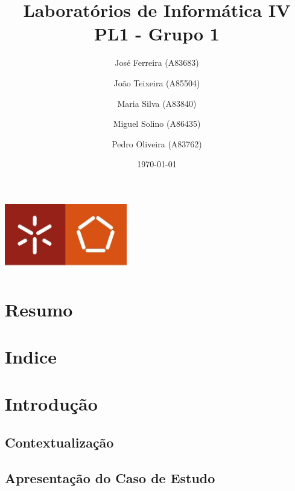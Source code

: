 \documentclass[a4paper]{report}
\begin{document}
\title{Laboratórios de Informática IV\\
\large PL1 - Grupo 1}
\author{José Ferreira (A83683) \and João Teixeira (A85504) \and Maria Silva (A83840) \and Miguel Solino (A86435) \and Pedro Oliveira (A83762)}
\date{\today}

\begin{center}
    \begin{minipage}{0.75\linewidth}
        \centering
        \includegraphics[width=0.4\textwidth]{images/eng.jpeg}\par\vspace{1cm}
        \vspace{1.5cm}
        \href{https://www.uminho.pt/PT}
        {\color{black}{\scshape\LARGE Universidade do Minho}} \par
        \vspace{1cm}
        \href{https://www.di.uminho.pt/}
        {\color{black}{\scshape\Large Departamento de Informática}} \par
        \vspace{1.5cm}
        \maketitle
    \end{minipage}
\end{center}


\chapter{Resumo}

\chapter{Indice}
\tableofcontents

\chapter{Introdução}
    \section{Contextualização}
    \section{Apresentação do Caso de Estudo}
\end{document}
